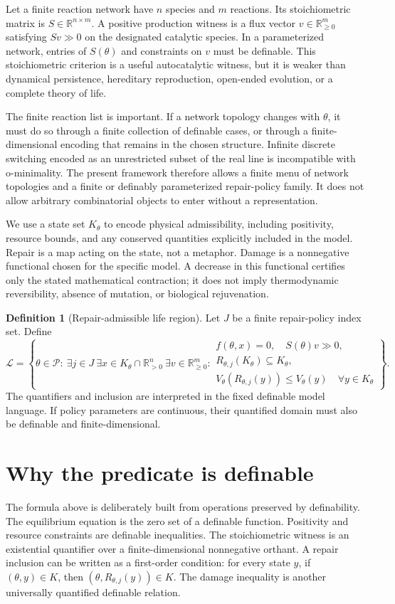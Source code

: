 \documentclass[11pt,a4paper]{article}
\theoremstyle{definition}
\newtheorem{definition}[theorem]{Definition}
\theoremstyle{remark}
\newcommand{\R}{\mathbb{R}}
\newcommand{\ThetaSet}{\mathcal{P}}
\newcommand{\Life}{\mathcal{L}}
\begin{document}
Let a finite reaction network have \(n\) species and \(m\) reactions. Its stoichiometric matrix is \(S\in\R^{n\times m}\). A positive production witness is a flux vector \(v\in\R^m_{\geq0}\) satisfying \(Sv\gg0\) on the designated catalytic species. In a parameterized network, entries of \(S(\theta)\) and constraints on \(v\) must be definable. This stoichiometric criterion is a useful autocatalytic witness, but it is weaker than dynamical persistence, hereditary reproduction, open-ended evolution, or a complete theory of life.

The finite reaction list is important. If a network topology changes with \(\theta\), it must do so through a finite collection of definable cases, or through a finite-dimensional encoding that remains in the chosen structure. Infinite discrete switching encoded as an unrestricted subset of the real line is incompatible with o-minimality. The present framework therefore allows a finite menu of network topologies and a finite or definably parameterized repair-policy family. It does not allow arbitrary combinatorial objects to enter without a representation.

We use a state set \(K_\theta\) to encode physical admissibility, including positivity, resource bounds, and any conserved quantities explicitly included in the model. Repair is a map acting on the state, not a metaphor. Damage is a nonnegative functional chosen for the specific model. A decrease in this functional certifies only the stated mathematical contraction; it does not imply thermodynamic reversibility, absence of mutation, or biological rejuvenation.

\begin{definition}[Repair-admissible life region]
Let \(J\) be a finite repair-policy index set. Define
\[
\Life=\left\{\theta\in\ThetaSet:\ \exists j\in J\ \exists x\in K_\theta\cap\R^n_{>0}\ \exists v\in\R^m_{\geq0}:
\begin{array}{l}
f(\theta,x)=0,\quad S(\theta)v\gg0,\\
R_{\theta,j}(K_\theta)\subseteq K_\theta,\\
V_\theta(R_{\theta,j}(y))\leq V_\theta(y)\quad\forall y\in K_\theta
\end{array}\right\}.
\]
The quantifiers and inclusion are interpreted in the fixed definable model language. If policy parameters are continuous, their quantified domain must also be definable and finite-dimensional.
\end{definition}

\section{Why the predicate is definable}
The formula above is deliberately built from operations preserved by definability. The equilibrium equation is the zero set of a definable function. Positivity and resource constraints are definable inequalities. The stoichiometric witness is an existential quantifier over a finite-dimensional nonnegative orthant. A repair inclusion can be written as a first-order condition: for every state \(y\), if \((\theta,y)\in K\), then \((\theta,R_{\theta,j}(y))\in K\). The damage inequality is another universally quantified definable relation.
\end{document}

